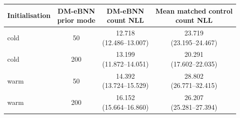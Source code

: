 \begin{tabular}{lccc}
\toprule
Initialisation & \shortstack{DM-eBNN\\prior mode} & \shortstack{DM-eBNN\\count NLL} & \shortstack{Mean matched control\\count NLL} \\
\midrule
cold & 50 & \shortstack{12.718\\(12.486--13.007)} & \shortstack{23.719\\(23.195--24.467)} \\
cold & 200 & \shortstack{13.199\\(11.872--14.051)} & \shortstack{20.291\\(17.602--22.035)} \\
\midrule
warm & 50 & \shortstack{14.392\\(13.724--15.529)} & \shortstack{28.802\\(26.771--32.415)} \\
warm & 200 & \shortstack{16.152\\(15.664--16.860)} & \shortstack{26.207\\(25.281--27.394)} \\
\bottomrule
\end{tabular}
